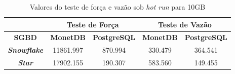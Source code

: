 \begin{table}[htpb]
        \centering
        \caption{Valores do teste de força e vazão sob \textit{hot run} para 10GB}
        \label{tab:forca_vazao_hot_10}
        \begin{tabular}{|c|c|c|c|c|} 
                \cline{2-5}
                \multicolumn{1}{c|}{}         & \multicolumn{2}{c|}{\textbf{Teste de Força} } & \multicolumn{2}{c|}{\textbf{Teste de Vazão} }  \\ 
                \hline
                 \textbf{SGBD}                & \textbf{MonetDB}  & \textbf{PostgreSQL}       & \textbf{MonetDB}  & \textbf{PostgreSQL}        \\ 
                \hline
                 \textit{\textbf{Snowflake}}  & 11861.997         & 870.994                   & 330.479           & 364.541                    \\ 
                \hline
                 \textit{\textbf{Star}}       & 17902.155         & 190.307                   & 583.560           & 149.455                    \\
                \hline
                \end{tabular}
                \end{table}

